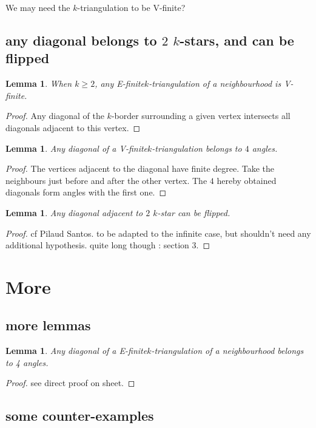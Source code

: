 \documentclass{amsart}
\newtheorem{lemma}[theorem]{Lemma}
\theoremstyle{remark}
\newcommand*{\nbd}[0]{neighbourhood\xspace}
\newcommand*{\ef}[0]{E-finite\xspace}
\newcommand*{\vf}[0]{V-finite\xspace}
\newcommand*{\ktg}[0]{$k$-triangulation\xspace}
\begin{document}
We may need the \ktg to be \vf?

\subsection{any diagonal belongs to $2$ $k$-stars, and can be flipped}

\begin{lemma}
When $k\geq 2$, any \ef \ktg of a \nbd is \vf.
\end{lemma}
\begin{proof}
Any diagonal of the $k$-border surrounding a given vertex intersects all diagonals adjacent to this vertex.
\end{proof}

\begin{lemma}
Any diagonal of a \vf \ktg belongs to $4$ angles.
\end{lemma}
\begin{proof}
The vertices adjacent to the diagonal have finite degree. Take the neighbours just before and after the other vertex. The $4$ hereby obtained diagonals form angles with the first one.
\end{proof}

\begin{lemma}
Any diagonal adjacent to $2$ $k$-star can be flipped.
\end{lemma}
\begin{proof}
cf Pilaud Santos. to be adapted to the infinite case, but shouldn't need any additional hypothesis. quite long though : section 3.
\end{proof}

\section{More}

\subsection{more lemmas}

\begin{lemma} 
Any diagonal of a \ef \ktg of a \nbd belongs to 4 angles. 
\end{lemma}
\begin{proof}
see direct proof on sheet.
\end{proof}

\subsection{some counter-examples}
\end{document}
